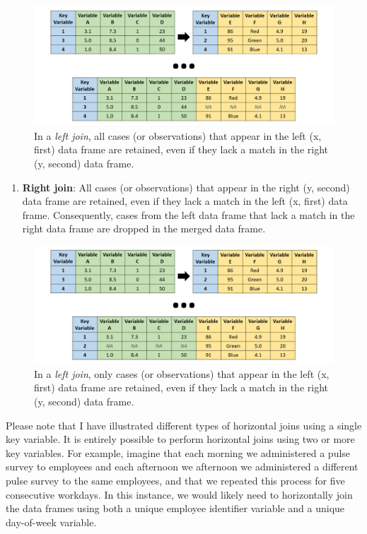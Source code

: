 \documentclass[]{book}
\providecommand{\tightlist}{%
  \setlength{\itemsep}{0pt}\setlength{\parskip}{0pt}}
\begin{document}
\begin{figure}
\centering
\includegraphics{left_join.png}
\caption{In a \emph{left join}, all cases (or observations) that appear
in the left (x, first) data frame are retained, even if they lack a
match in the right (y, second) data frame.}
\end{figure}

\begin{enumerate}
\def\labelenumi{\arabic{enumi}.}
\setcounter{enumi}{3}
\tightlist
\item
  \textbf{Right join}: All cases (or observations) that appear in the
  right (y, second) data frame are retained, even if they lack a match
  in the left (x, first) data frame. Consequently, cases from the left
  data frame that lack a match in the right data frame are dropped in
  the merged data frame.
\end{enumerate}

\begin{figure}
\centering
\includegraphics{right_join.png}
\caption{In a \emph{left join}, only cases (or observations) that appear
in the left (x, first) data frame are retained, even if they lack a
match in the right (y, second) data frame.}
\end{figure}

Please note that I have illustrated different types of horizontal joins
using a single key variable. It is entirely possible to perform
horizontal joins using two or more key variables. For example, imagine
that each morning we administered a pulse survey to employees and each
afternoon we afternoon we administered a different pulse survey to the
same employees, and that we repeated this process for five consecutive
workdays. In this instance, we would likely need to horizontally join
the data frames using both a unique employee identifier variable and a
unique day-of-week variable.
\end{document}
